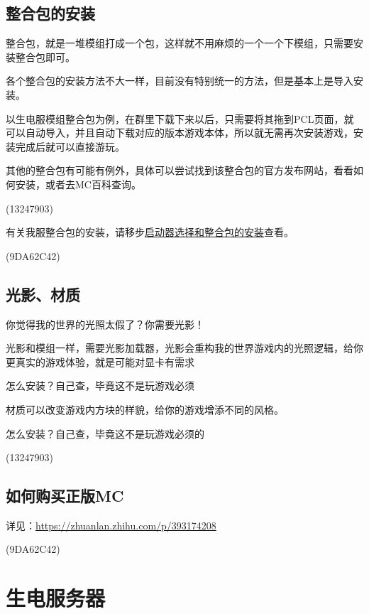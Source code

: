 \documentclass[UTF8,a4paper]{article}
\begin{document}
		\subsection{整合包的安装}
			\par 整合包，就是一堆模组打成一个包，这样就不用麻烦的一个一个下模组，只需要安装整合包即可。
			\par 各个整合包的安装方法不大一样，目前没有特别统一的方法，但是基本上是导入安装。
			\par 以生电服模组整合包为例，在群里下载下来以后，只需要将其拖到PCL页面，就可以自动导入，并且自动下载对应的版本游戏本体，所以就无需再次安装游戏，安装完成后就可以直接游玩。
			\par 其他的整合包有可能有例外，具体可以尝试找到该整合包的官方发布网站，看看如何安装，或者去MC百科查询。
			\begin{flushright}(13247903)\end{flushright}
			\par 有关我服整合包的安装，请移步\hyperlink{qidongqixuanze}{启动器选择和整合包的安装}查看。
			\begin{flushright}(9DA62C42)\end{flushright}
		\subsection{光影、材质}
			\hypertarget{guangying}{}
			\par 你觉得我的世界的光照太假了？你需要光影！
			\par 光影和模组一样，需要光影加载器，光影会重构我的世界游戏内的光照逻辑，给你更真实的游戏体验，就是可能对显卡有需求
			\par 怎么安装？自己查，毕竟这不是玩游戏必须
			\par 材质可以改变游戏内方块的样貌，给你的游戏增添不同的风格。
			\par 怎么安装？自己查，毕竟这不是玩游戏必须的
			\begin{flushright}(13247903)\end{flushright}
		\subsection{如何购买正版MC}
			\par 详见：\href{https://zhuanlan.zhihu.com/p/393174208}{https://zhuanlan.zhihu.com/p/393174208}
			\begin{flushright}(9DA62C42)\end{flushright}

	\section{生电服务器}
\end{document}
